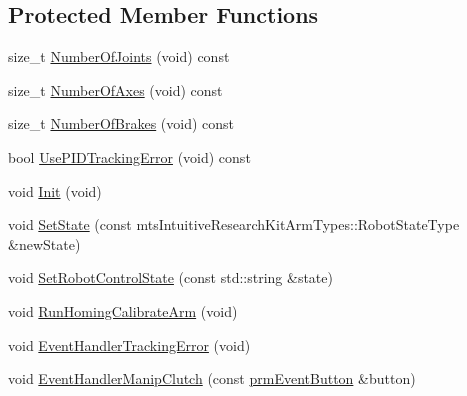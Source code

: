 \subsection*{Protected Member Functions}
\begin{DoxyCompactItemize}
\item 
size\+\_\+t \hyperlink{classmts_intuitive_research_kit_e_c_m_a1a58a2415e93713fb2f422c0d3405115}{Number\+Of\+Joints} (void) const 
\item 
size\+\_\+t \hyperlink{classmts_intuitive_research_kit_e_c_m_a80fe83ee8ce1c474ca1ebbaa02a6cc32}{Number\+Of\+Axes} (void) const 
\item 
size\+\_\+t \hyperlink{classmts_intuitive_research_kit_e_c_m_a13c7bdfecbb523995b0a78debbe8dbab}{Number\+Of\+Brakes} (void) const 
\item 
bool \hyperlink{classmts_intuitive_research_kit_e_c_m_ae6af0b7292da7676cbcb10ae7b27b2ef}{Use\+P\+I\+D\+Tracking\+Error} (void) const 
\item 
void \hyperlink{classmts_intuitive_research_kit_e_c_m_a75f7468b431ea7912638bc78a0419589}{Init} (void)
\item 
void \hyperlink{classmts_intuitive_research_kit_e_c_m_ac44c187c7f6559cbeced4b77df2af902}{Set\+State} (const mts\+Intuitive\+Research\+Kit\+Arm\+Types\+::\+Robot\+State\+Type \&new\+State)
\item 
void \hyperlink{classmts_intuitive_research_kit_e_c_m_ac98464cd78890b5f173156d29b962e98}{Set\+Robot\+Control\+State} (const std\+::string \&state)
\item 
void \hyperlink{classmts_intuitive_research_kit_e_c_m_ab16dee65415c9d75ac1cd6617c61293b}{Run\+Homing\+Calibrate\+Arm} (void)
\item 
void \hyperlink{classmts_intuitive_research_kit_e_c_m_a266ed9b7ef180009b3b0b7dbea37440c}{Event\+Handler\+Tracking\+Error} (void)
\item 
void \hyperlink{classmts_intuitive_research_kit_e_c_m_a224c381c3997489e2cfcdb4fa2e64cbc}{Event\+Handler\+Manip\+Clutch} (const \hyperlink{classprm_event_button}{prm\+Event\+Button} \&button)
\end{DoxyCompactItemize}
